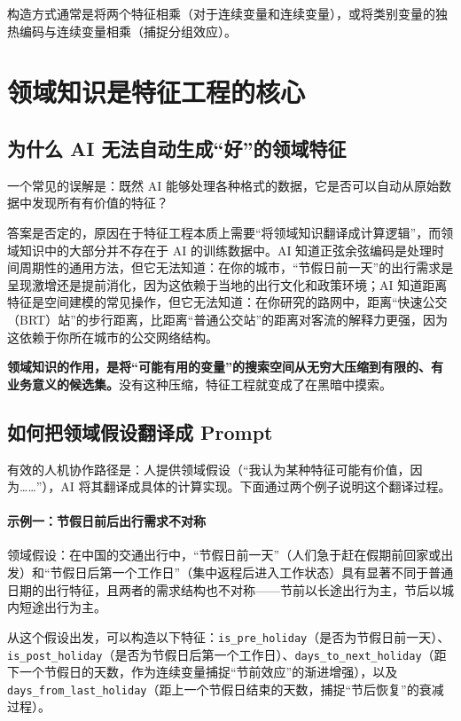 构造方式通常是将两个特征相乘（对于连续变量和连续变量），或将类别变量的独热编码与连续变量相乘（捕捉分组效应）。


\section{领域知识是特征工程的核心}

\subsection{为什么 AI 无法自动生成“好”的领域特征}

一个常见的误解是：既然 AI 能够处理各种格式的数据，它是否可以自动从原始数据中发现所有有价值的特征？

答案是否定的，原因在于特征工程本质上需要“将领域知识翻译成计算逻辑”，而领域知识中的大部分并不存在于 AI 的训练数据中。AI 知道正弦余弦编码是处理时间周期性的通用方法，但它无法知道：在你的城市，“节假日前一天”的出行需求是呈现激增还是提前消化，因为这依赖于当地的出行文化和政策环境；AI 知道距离特征是空间建模的常见操作，但它无法知道：在你研究的路网中，距离“快速公交（BRT）站”的步行距离，比距离“普通公交站”的距离对客流的解释力更强，因为这依赖于你所在城市的公交网络结构。

\textbf{领域知识的作用，是将“可能有用的变量”的搜索空间从无穷大压缩到有限的、有业务意义的候选集。}没有这种压缩，特征工程就变成了在黑暗中摸索。

\subsection{如何把领域假设翻译成 Prompt}

有效的人机协作路径是：人提供领域假设（“我认为某种特征可能有价值，因为……”），AI 将其翻译成具体的计算实现。下面通过两个例子说明这个翻译过程。

\paragraph{示例一：节假日前后出行需求不对称}

领域假设：在中国的交通出行中，“节假日前一天”（人们急于赶在假期前回家或出发）和“节假日后第一个工作日”（集中返程后进入工作状态）具有显著不同于普通日期的出行特征，且两者的需求结构也不对称——节前以长途出行为主，节后以城内短途出行为主。

从这个假设出发，可以构造以下特征：\texttt{is\_pre\_holiday}（是否为节假日前一天）、\texttt{is\_post\_holiday}（是否为节假日后第一个工作日）、\texttt{days\_to\_next\_holiday}（距下一个节假日的天数，作为连续变量捕捉“节前效应”的渐进增强），以及 \texttt{days\_from\_last\_holiday}（距上一个节假日结束的天数，捕捉“节后恢复”的衰减过程）。

